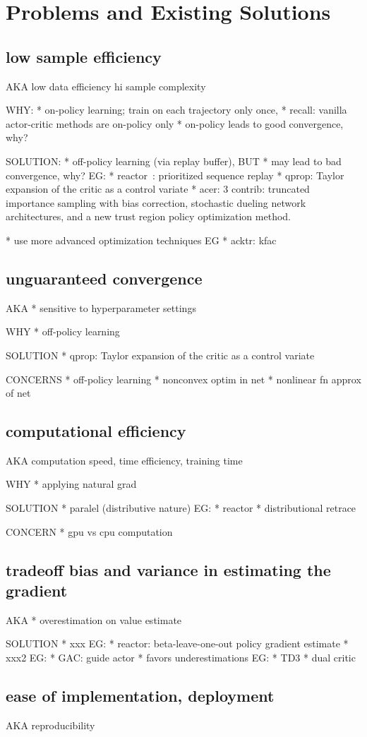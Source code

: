 \section{Problems and Existing Solutions}

\subsection{low sample efficiency}
AKA
low data efficiency
hi sample complexity

WHY:
* on-policy learning; train on each trajectory only once,
  * recall: vanilla actor-critic methods are on-policy only
  * on-policy leads to good convergence, why?

SOLUTION:
* off-policy learning (via replay buffer),
  BUT
  * may lead to bad convergence, why?
  EG:
  * reactor~\cite{Gruslys2018}: prioritized sequence replay
  * qprop:  Taylor expansion of the critic as a control variate
  * acer: 3 contrib:
    truncated importance sampling with bias correction,
    stochastic dueling network architectures, and
    a new trust region policy optimization method.

* use more advanced optimization techniques
EG
* acktr: kfac

\subsection{unguaranteed convergence}

AKA
* sensitive to hyperparameter settings

WHY
* off-policy learning

SOLUTION
* qprop: Taylor expansion of the critic as a control variate

CONCERNS
* off-policy learning
* nonconvex optim in net
* nonlinear fn approx of net

\subsection{computational efficiency}
AKA
computation speed,
time efficiency,
training time

WHY
* applying natural grad

SOLUTION
* paralel (distributive nature)
  EG:
  * reactor
    * distributional retrace

CONCERN
* gpu vs cpu computation

\subsection{tradeoff bias and variance in estimating the gradient}
AKA
* overestimation on value estimate

SOLUTION
* xxx
  EG:
  * reactor: beta-leave-one-out policy gradient estimate
* xxx2
  EG:
  * GAC: guide actor
* favors underestimations
  EG:
  * TD3
* dual critic

\subsection{ease of implementation, deployment}
AKA
reproducibility

